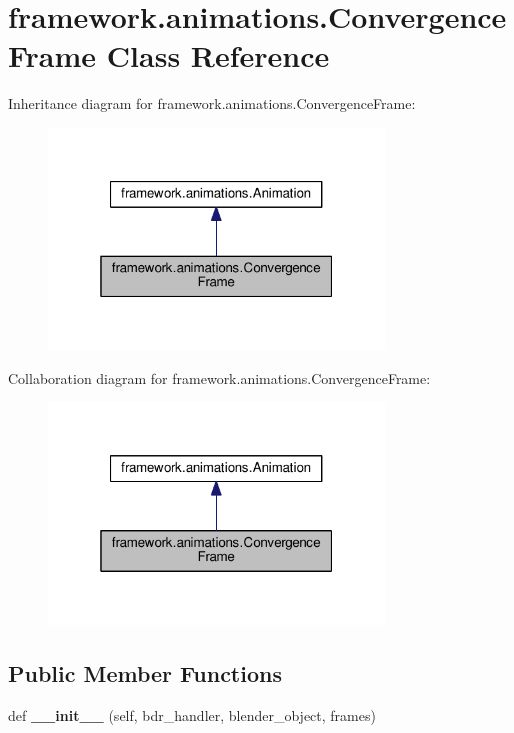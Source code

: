 \hypertarget{classframework_1_1animations_1_1ConvergenceFrame}{}\section{framework.\+animations.\+Convergence\+Frame Class Reference}
\label{classframework_1_1animations_1_1ConvergenceFrame}


Inheritance diagram for framework.\+animations.\+Convergence\+Frame\+:
\nopagebreak
\begin{figure}[H]
\begin{center}
\leavevmode
\includegraphics[width=253pt]{classframework_1_1animations_1_1ConvergenceFrame__inherit__graph}
\end{center}
\end{figure}


Collaboration diagram for framework.\+animations.\+Convergence\+Frame\+:
\nopagebreak
\begin{figure}[H]
\begin{center}
\leavevmode
\includegraphics[width=253pt]{classframework_1_1animations_1_1ConvergenceFrame__coll__graph}
\end{center}
\end{figure}
\subsection*{Public Member Functions}
\begin{DoxyCompactItemize}
\item 
def {\bfseries \+\_\+\+\_\+init\+\_\+\+\_\+} (self, bdr\+\_\+handler, blender\+\_\+object, frames)\hypertarget{classframework_1_1animations_1_1ConvergenceFrame_a66e82c5c5b56b3efd47b05b93ad5caec}{}\label{classframework_1_1animations_1_1ConvergenceFrame_a66e82c5c5b56b3efd47b05b93ad5caec}

\end{DoxyCompactItemize}
